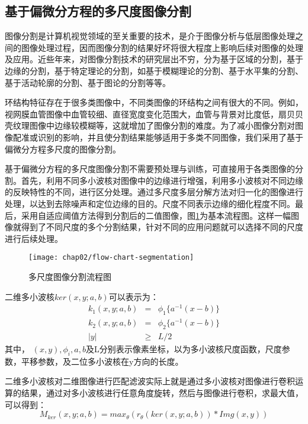 \subsection{基于偏微分方程的多尺度图像分割}

图像分割是计算机视觉领域的至关重要的技术，是介于图像分析与低层图像处理之间的图像处理过程，因而图像分割的结果好坏将很大程度上影响后续对图像的处理及应用。近些年来，对图像分割技术的研究层出不穷，分为基于区域的分割，基于边缘的分割，基于特定理论的分割，如基于模糊理论的分割、基于水平集的分割、基于活动轮廓的分割、基于图论的分割\cite{xuxiaoli}等等。

环结构特征存在于很多类图像中，不同类图像的环结构之间有很大的不同。例如，视网膜血管图像中血管较细、直径宽度变化范围大，血管与背景对比度低，扇贝贝壳纹理图像中边缘较模糊等，这就增加了图像分割的难度。为了减小图像分割对图像配准或识别的影响，并且使分割结果能够适用于多类不同图像，我们采用了基于偏微分方程多尺度的图像分割。

基于偏微分方程的多尺度图像分割\cite{wang2013retinal}不需要预处理与训练，可直接用于各类图像的分割。首先，利用不同多小波核对图像中的边缘进行增强，利用多小波核对不同边缘的反映特性的不同，进行区分处理。通过多尺度多层分解方法对归一化的图像进行处理，以达到去除噪声和定位边缘的目的。尺度不同表示边缘的细化程度不同。最后，采用自适应阈值方法得到分割后的二值图像，图\ref{fig:flow-segmentation}为基本流程图。这样一幅图像就得到了不同尺度的多个分割结果，针对不同的应用问题就可以选择不同的尺度进行后续处理。

\begin{figure}[H]
\centering
    \centering
    \texttt{[image: chap02/flow-chart-segmentation]}\medskip
\caption{多尺度图像分割流程图}
\label{fig:flow-segmentation}
\end{figure}

二维多小波核$ker(x,y;a,b)$可以表示为：
\begin{eqnarray}
k_1(x,y;a,b)&=&\phi_1\{a^{-1}(x-b)\}\\
k_2(x,y;a,b)&=&\phi_2\{a^{-1}(x-b)\}\\
|y| &\geq& L/2
\end{eqnarray}
其中， $(x,y), \phi_i,a,b$及L分别表示像素坐标，以为多小波核尺度函数，尺度参数，平移参数，及二位多小波核在y方向的长度。

二维多小波核对二维图像进行匹配滤波实际上就是通过多小波核对图像进行卷积运算的结果，通过对多小波核进行任意角度旋转，然后与图像进行卷积，求最大值，可以得到：
\begin{equation}
M_{ker}(x,y;a,b) = max_\theta(r_\theta(ker(x,y;a,b)) \ast Img(x,y))
\end{equation} 

